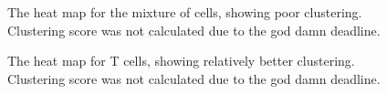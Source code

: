 \documentclass[3p,authoryear,preprint,12pt]{elsarticle}
\makeatletter
\def\fixFloatSize#1{}%
\makeatother
\begin{document}
\bgroup
\fixFloatSize{img/mixHeatmap.png}
\begin{figure}[!htbp]
	\centering \makeatletter{}
	\makeatother 
	\caption{{The heat map for the mixture of cells, showing poor clustering. Clustering score was not calculated due to the god damn deadline.}}
	\label{f-c2b15a1baca9}
\end{figure}
\egroup
\bgroup
\fixFloatSize{img/THeatmap.png}
\begin{figure}[!htbp]
	\centering \makeatletter{}
	\makeatother 
	\caption{{The heat map for T cells, showing relatively better clustering. Clustering score was not calculated due to the god damn deadline.}}
	\label{f-c2b15a1baca9}
\end{figure}
\end{document}
